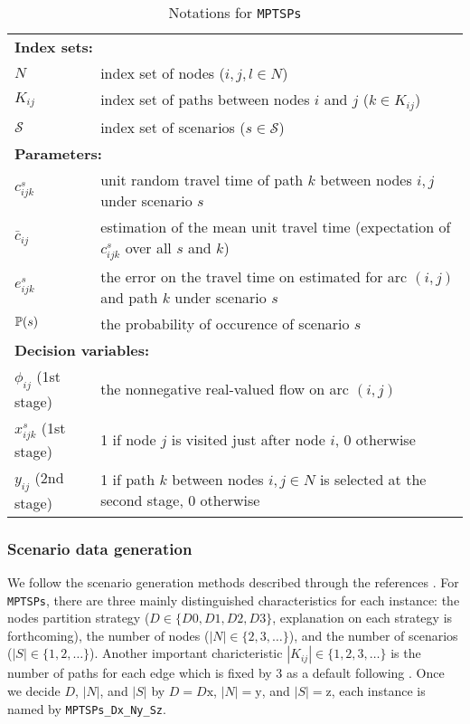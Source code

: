\begin{table}[H]
	\caption{Notations for \texttt{MPTSPs}}
	\label{mptsps:notation}
	\resizebox{\textwidth}{!}
	{
		\begin{tabular}{ll}
			\toprule
			\multicolumn{2}{l}{\textbf{Index sets:}} \\
			$N$ & \textrm{index set of nodes ($i,j,l\in N$)} \\ 
			$K_{ij}$ & \textrm{index set of paths between nodes $i$ and $j$ ($k\in K_{ij}$)} \\ 
			$\mathcal{S}$ & \textrm{index set of scenarios ($s\in \mathcal{S}$)}\\ \midrule
			\multicolumn{2}{l}{\textbf{Parameters:}} \\
			$c_{ijk}^{s}$ & \textrm{unit random travel time of path $k$ between nodes $i,j$ under scenario $s$} \\ 
			$\bar{c}_{ij}$ & \textrm{estimation of the mean unit travel time (expectation of $c_{ijk}^{s}$ over all $s$ and $k$)} \\ 
			$e_{ijk}^{s}$ & \textrm{the error on the travel time on estimated for arc $(i,j)$ and path $k$ under scenario $s$} \\ 
			$\operatorname*{\mathbb{P}}(s)$ & \textrm{the probability of occurence of scenario $s$} \\  \midrule
			\multicolumn{2}{l}{\textbf{Decision variables:}} \\
			$\phi_{ij}$ (1st stage) & \textrm{the nonnegative real-valued flow on arc $(i,j)$}\\
			$x_{ijk}^{s}$ (1st stage) & \textrm{1 if node $j$ is visited just after node $i$, 0 otherwise} \\ 
			$y_{ij}$ (2nd stage)& \textrm{1 if path $k$ between nodes $i,j\in N$ is selected at the second stage, 0 otherwise} \\  
			\bottomrule
		\end{tabular}
	}
\end{table} 


\subsubsection{Scenario data generation}
We follow the scenario generation methods described through the references \cite{journal:MPT2014,journal:PGM2017,journal:TPP2017}. For \texttt{MPTSPs}, there are three mainly distinguished characteristics for each instance: the nodes partition strategy ($D\in\{D0,D1,D2,D3\}$, explanation on each strategy is forthcoming), the number of nodes ($|N|\in\{2,3,\ldots\}$), and the number of scenarios ($|S|\in\{1,2,\ldots\}$). Another important charicteristic $|K_{ij}|\in\{1,2,3,\ldots\}$ is the number of paths for each edge which is fixed by 3 as a default following \cite{journal:TPP2017}. Once we decide $D$, $|N|$, and $|S|$ by $D=D\textrm{x}$, $|N|=\textrm{y}$, and $|S|=\textrm{z}$, each instance is named by \texttt{MPTSPs\_Dx\_Ny\_Sz}.


